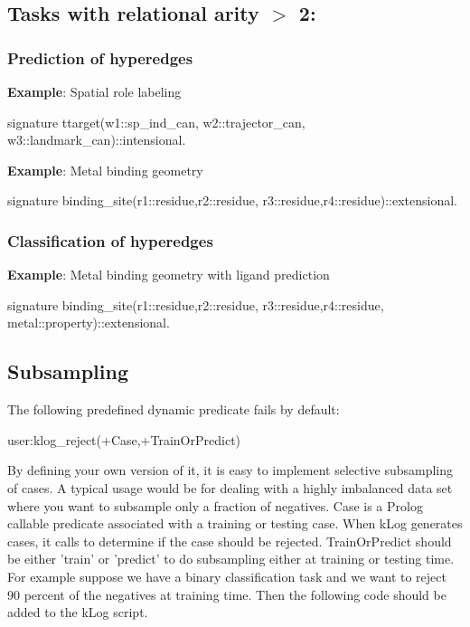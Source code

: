 \subsection{Tasks with relational arity $>$ 2:}

\subsubsection{Prediction of hyperedges}

\textbf{Example}: Spatial role labeling

\begin{code}
signature ttarget(w1::sp_ind_can, w2::trajector_can,
                  w3::landmark_can)::intensional.
\end{code}

\textbf{Example}: Metal binding geometry

\begin{code}
signature binding_site(r1::residue,r2::residue,
                       r3::residue,r4::residue)::extensional.
\end{code}

\subsubsection{Classification of hyperedges}

\textbf{Example}: Metal binding geometry with ligand prediction

\begin{code}
signature binding_site(r1::residue,r2::residue,
                       r3::residue,r4::residue,
                       metal::property)::extensional.
\end{code}

\subsection{Subsampling}

The following predefined dynamic predicate fails by default:

\begin{code}
  user:klog_reject(+Case,+TrainOrPredict)
\end{code}

By defining your own version of it, it is easy to implement
selective subsampling of cases. A typical usage would be for dealing
with a highly imbalanced data set where you want to subsample only a
fraction of negatives. Case is a Prolog callable predicate
associated with a training or testing case. When kLog generates
cases, it calls  to determine if the case should
be rejected. TrainOrPredict should be either 'train' or 'predict' to
do subsampling either at training or testing time. For example
suppose we have a binary classification task and we want to reject
90 percent of the negatives at training time. Then the following
code should be added to the kLog script.

